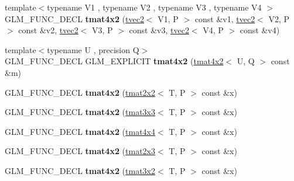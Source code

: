 \begin{DoxyCompactItemize}
\item 
\hypertarget{structglm_1_1tmat4x2_a7cd1e8f9db551f8fd8e813c19896349f}{{\footnotesize template$<$typename V1 , typename V2 , typename V3 , typename V4 $>$ }\\G\-L\-M\-\_\-\-F\-U\-N\-C\-\_\-\-D\-E\-C\-L {\bfseries tmat4x2} (\hyperlink{structglm_1_1tvec2}{tvec2}$<$ V1, P $>$ const \&v1, \hyperlink{structglm_1_1tvec2}{tvec2}$<$ V2, P $>$ const \&v2, \hyperlink{structglm_1_1tvec2}{tvec2}$<$ V3, P $>$ const \&v3, \hyperlink{structglm_1_1tvec2}{tvec2}$<$ V4, P $>$ const \&v4)}\label{structglm_1_1tmat4x2_a7cd1e8f9db551f8fd8e813c19896349f}

\item 
\hypertarget{structglm_1_1tmat4x2_a23ca50837bdbc3d1d47bd7010bdb7fa3}{{\footnotesize template$<$typename U , precision Q$>$ }\\G\-L\-M\-\_\-\-F\-U\-N\-C\-\_\-\-D\-E\-C\-L G\-L\-M\-\_\-\-E\-X\-P\-L\-I\-C\-I\-T {\bfseries tmat4x2} (\hyperlink{structglm_1_1tmat4x2}{tmat4x2}$<$ U, Q $>$ const \&m)}\label{structglm_1_1tmat4x2_a23ca50837bdbc3d1d47bd7010bdb7fa3}

\item 
\hypertarget{structglm_1_1tmat4x2_a3b1ff5d64e45f40470ff4f9444cd2df2}{G\-L\-M\-\_\-\-F\-U\-N\-C\-\_\-\-D\-E\-C\-L {\bfseries tmat4x2} (\hyperlink{structglm_1_1tmat2x2}{tmat2x2}$<$ T, P $>$ const \&x)}\label{structglm_1_1tmat4x2_a3b1ff5d64e45f40470ff4f9444cd2df2}

\item 
\hypertarget{structglm_1_1tmat4x2_a71e868a6a85279e207950ac5e7711a66}{G\-L\-M\-\_\-\-F\-U\-N\-C\-\_\-\-D\-E\-C\-L {\bfseries tmat4x2} (\hyperlink{structglm_1_1tmat3x3}{tmat3x3}$<$ T, P $>$ const \&x)}\label{structglm_1_1tmat4x2_a71e868a6a85279e207950ac5e7711a66}

\item 
\hypertarget{structglm_1_1tmat4x2_a608f5602af9fbdf9075c7995a77c3713}{G\-L\-M\-\_\-\-F\-U\-N\-C\-\_\-\-D\-E\-C\-L {\bfseries tmat4x2} (\hyperlink{structglm_1_1tmat4x4}{tmat4x4}$<$ T, P $>$ const \&x)}\label{structglm_1_1tmat4x2_a608f5602af9fbdf9075c7995a77c3713}

\item 
\hypertarget{structglm_1_1tmat4x2_ac30a3bf56c379579c163de80e7b72471}{G\-L\-M\-\_\-\-F\-U\-N\-C\-\_\-\-D\-E\-C\-L {\bfseries tmat4x2} (\hyperlink{structglm_1_1tmat2x3}{tmat2x3}$<$ T, P $>$ const \&x)}\label{structglm_1_1tmat4x2_ac30a3bf56c379579c163de80e7b72471}

\item 
\hypertarget{structglm_1_1tmat4x2_aee16cca306328efa2f3e67da113e2b1c}{G\-L\-M\-\_\-\-F\-U\-N\-C\-\_\-\-D\-E\-C\-L {\bfseries tmat4x2} (\hyperlink{structglm_1_1tmat3x2}{tmat3x2}$<$ T, P $>$ const \&x)}\label{structglm_1_1tmat4x2_aee16cca306328efa2f3e67da113e2b1c}


\end{DoxyCompactItemize}
